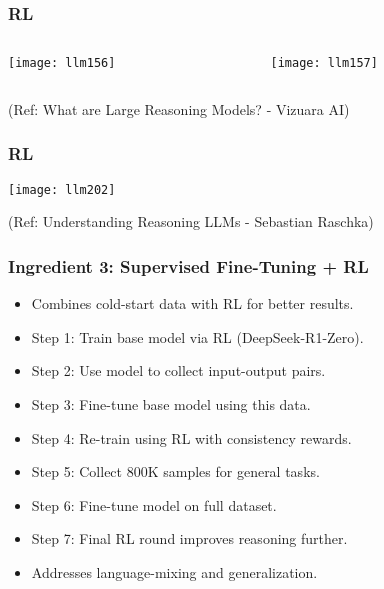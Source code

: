\begin{frame}[fragile]\frametitle{RL}


\begin{columns}
    \begin{column}[T]{0.5\linewidth}
		\begin{center}
		\texttt{[image: llm156]}
		\end{center}

    \end{column}
    \begin{column}[T]{0.5\linewidth}
		\begin{center}
		\texttt{[image: llm157]}
		\end{center}
    \end{column}
  \end{columns}
  

{\tiny (Ref: What are Large Reasoning Models? - Vizuara AI)}

\end{frame}

\begin{frame}[fragile]\frametitle{RL}

  
  		\begin{center}
		\texttt{[image: llm202]}
		
		{\tiny (Ref: Understanding Reasoning LLMs - Sebastian Raschka)}

		\end{center}

\end{frame}


\begin{frame}[fragile]\frametitle{Ingredient 3: Supervised Fine-Tuning + RL}
\begin{itemize}
  \item Combines cold-start data with RL for better results.
  \item Step 1: Train base model via RL (DeepSeek-R1-Zero).
  \item Step 2: Use model to collect input-output pairs.
  \item Step 3: Fine-tune base model using this data.
  \item Step 4: Re-train using RL with consistency rewards.
  \item Step 5: Collect 800K samples for general tasks.
  \item Step 6: Fine-tune model on full dataset.
  \item Step 7: Final RL round improves reasoning further.
  \item Addresses language-mixing and generalization.
\end{itemize}
\end{frame}

